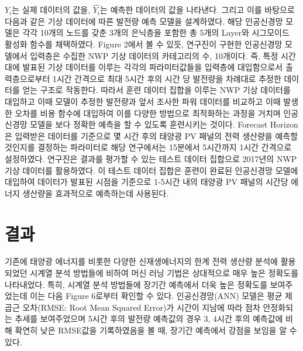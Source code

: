 \documentclass{article}
\begin{document}
$Y_i$는 실제 데이터의 값을, $\hat{Y_i}$는 예측한 데이터의 값을 나타낸다.
그리고 이를 바탕으로 다음과 같은 기상 데이터에 따른 발전량 예측 모델을 설계하였다. 해당 인공신경망 모델은 각각 10개의 노드를 갖춘 3개의 은닉층을 포함한 총 5개의 Layer와 시그모이드 활성화 함수를 채택하였다. Figure 2에서 볼 수 있듯, 연구진이 구현한 인공신경망 모델에서 입력층은 수집한 NWP 기상 데이터의 카테고리의 수, 10개이다. 즉, 특정 시간대에 발표된 기상 데이터를 이루는 각각의 파라미터값들을 입력층에 대입함으로서 출력층으로부터 1시간 간격으로 최대 5시간 후의 시간 당 발전량을 차례대로 추정한 데이터를 얻는 구조로 작동한다. 따라서 훈련 데이터 집합을 이루는 NWP 기상 데이터를 대입하고 이때 모델이 추정한 발전량과 앞서 조사한 파워 데이터를 비교하고 이때 발생한 오차를 비용 함수에 대입하여 이를 다양한 방법으로 최적화하는 과정을 거치며 인공신경망 모델을 보다 정확한 예측을 할 수 있도록 훈련시키는 것이다. Forecast Horizon은 입력받은 데이터를 기준으로 몇 시간 후의 태양광 PV 패널의 전력 생산량을 예측할 것인지를 결정하는 파라미터로 해당 연구에서는 15분에서 5시간까지 1시간 간격으로 설정하였다. 연구진은 결과를 평가할 수 있는 테스트 데이터 집합으로 2017년의 NWP 기상 데이터를 활용하였다. 이 테스트 데이터 집합은 훈련이 완료된 인공신경망 모델에 대입하여 데이터가 발표된 시점을 기준으로 1-5시간 내의 태양광 PV 패널의 시간당 에너지 생산량을 효과적으로 예측하는데 사용된다.



\section{결과}
기존에 태양광 에너지를 비롯한 다양한 신재생에너지의 한계 전력 생산량 분석에 활용되었던 시계열 분석 방법들에 비하여 머신 러닝 기법은 상대적으로 매우 높은 정확도를 나타내었다. 특히, 시계열 분석 방법들에 장기간 예측에서 더욱 높은 정확도를 보여주었는데 이는 다음 Figure 6로부터 확인할 수 있다. 인공신경망(ANN) 모델은 평균 제곱근 오차(RMSE: Root Mean Squared Error)가 시간이 지남에 따라 점차 안정화되는 추세를 보여주었으며 5시간 후의 발전량 예측값의 경우 3, 4시간 후의 예측값에 비해 확연히 낮은 RMSE값을 기록하였음을 볼 때, 장기간 예측에서 강점을 보임을 알 수 있다.
\end{document}
